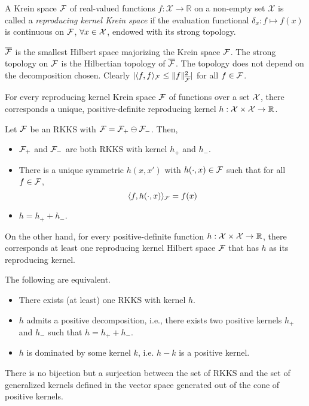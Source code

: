 \begin{definition}
  A Krein space ${\mathcal F}$ of real-valued functions $f:\mathcal X \rightarrow \mathbb R$ on a non-empty set $\mathcal X$ is called a \emph{reproducing kernel Krein space} if the evaluation functional $\delta_x: f \mapsto f(x)$ is continuous on ${\mathcal F}$, $\forall x \in {\mathcal X}$, endowed with its strong topology. 
\end{definition}

$\overline{{\mathcal F}}$ is the smallest Hilbert space majorizing the Krein space ${\mathcal F}$.
The strong topology on ${\mathcal F}$ is the Hilbertian topology of $\overline{{\mathcal F}}$.
The topology does not depend on the decomposition chosen.
Clearly $|\langle f,f\rangle_{\mathcal F} \leq \lVert f\rVert^2_{\overline{{\mathcal F}}}|$ for all $f\in{\mathcal F}$.

For every reproducing kernel Krein space ${\mathcal F}$ of functions over a set ${\mathcal X}$, there corresponds a unique, positive-definite reproducing kernel $h:{\mathcal X}\times{\mathcal X}\to\mathbb{R}$.

\begin{lemma}
  Let ${\mathcal F}$ be an RKKS with ${\mathcal F} = {\mathcal F}_+ \ominus {\mathcal F}_-$.
  Then,
  \begin{itemize}
    \item ${\mathcal F}_+$ and ${\mathcal F}_-$ are both RKKS with kernel $h_+$ and $h_-$.
    \item There is a unique symmetric $h(x,x')$ with $h(\cdot,x)\in{\mathcal F}$ such that for all $f\in{\mathcal F}$, 
    \[
      \langle f,h(\cdot,x)\rangle_{\mathcal F} = f(x)
    \]
    \item $h = h_+ + h_-$.
  \end{itemize}
\end{lemma}

On the other hand, for every positive-definite function $h:{\mathcal X}\times{\mathcal X}\to\mathbb{R}$, there corresponds at least one reproducing kernel Hilbert space ${\mathcal F}$ that has $h$ as its reproducing kernel.

\begin{lemma}
  The following are equivalent.
  \begin{itemize}
    \item There exists (at least) one RKKS with kernel $h$.
    \item $h$ admits a positive decomposition, i.e., there exists two positive kernels $h_+$ and $h_-$ such that $h=h_++h_-$.
    \item $h$ is dominated by some kernel $k$, i.e. $h-k$ is a positive kernel.
  \end{itemize}
\end{lemma}

There is no bijection but a surjection between the set of RKKS and the set of generalized kernels defined in the vector space generated out of the cone of positive kernels.




















